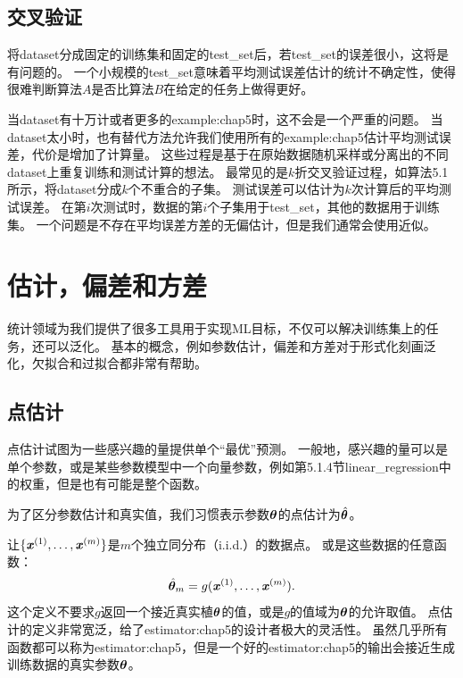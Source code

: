 \subsection{交叉验证}
\label{sec:cross_validation}
将\gls{dataset}分成固定的训练集和固定的\gls{test_set}后，若\gls{test_set}的误差很小，这将是有问题的。
一个小规模的\gls{test_set}意味着平均测试误差估计的统计不确定性，使得很难判断算法$A$是否比算法$B$在给定的任务上做得更好。


当\gls{dataset}有十万计或者更多的\gls{example:chap5}时，这不会是一个严重的问题。
当\gls{dataset}太小时，也有替代方法允许我们使用所有的\gls{example:chap5}估计平均测试误差，代价是增加了计算量。
这些过程是基于在原始数据随机采样或分离出的不同\gls{dataset}上重复训练和测试计算的想法。
最常见的是$k$折交叉验证过程，如算法5.1所示，将\gls{dataset}分成$k$个不重合的子集。
测试误差可以估计为$k$次计算后的平均测试误差。
在第$i$次测试时，数据的第$i$个子集用于\gls{test_set}，其他的数据用于训练集。
一个问题是不存在平均误差方差的无偏估计\citep{Bengio-Grandvalet-JMLR-04}，但是我们通常会使用近似。

\section{估计，偏差和方差}
\label{sec:estimators_bias_and_variance}
统计领域为我们提供了很多工具用于实现\gls{ML}目标，不仅可以解决训练集上的任务，还可以泛化。
基本的概念，例如参数估计，偏差和方差对于形式化刻画泛化，欠拟合和过拟合都非常有帮助。

\subsection{点估计}
\label{sec:point_estimation}
点估计试图为一些感兴趣的量提供单个``最优''预测。
一般地，感兴趣的量可以是单个参数，或是某些参数模型中一个向量参数，例如第5.1.4节\gls{linear_regression}中的权重，但是也有可能是整个函数。

为了区分参数估计和真实值，我们习惯表示参数$\boldsymbol{\theta}$的点估计为$\hat{\boldsymbol{\theta}}$。

让$\{\boldsymbol{\mathit{x}}^{(1)},\dots,\boldsymbol{\mathit{x}}^{(m)}\}$是$m$个独立同分布（i.i.d.）的数据点。
或是这些数据的任意函数：
\begin{equation}
    \hat{\boldsymbol{\theta}}_m = g(\boldsymbol{\mathit{x}}^{(1)}, \dots, \boldsymbol{\mathit{x}}^{(m)}) .
\end{equation}
这个定义不要求$g$返回一个接近真实植$\boldsymbol{\theta}$的值，或是$g$的值域为$\boldsymbol{\theta}$的允许取值。
点估计的定义非常宽泛，给了\gls{estimator:chap5}的设计者极大的灵活性。
虽然几乎所有函数都可以称为\gls{estimator:chap5}，但是一个好的\gls{estimator:chap5}的输出会接近生成训练数据的真实参数$\boldsymbol{\theta}$。

